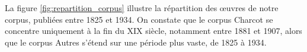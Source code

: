 %
%
%
%
%
%
%
%
%
%
%


La figure \ref{fig:repartition_corpus} illustre la répartition des \oe{}uvres de notre corpus, publiées entre 1825 et 1934. On constate que le corpus Charcot se concentre uniquement à la fin du XIX\ieme{} siècle, notamment entre 1881 et 1907, alors que le corpus Autres s'étend sur une période plus vaste, de 1825 à 1934.








